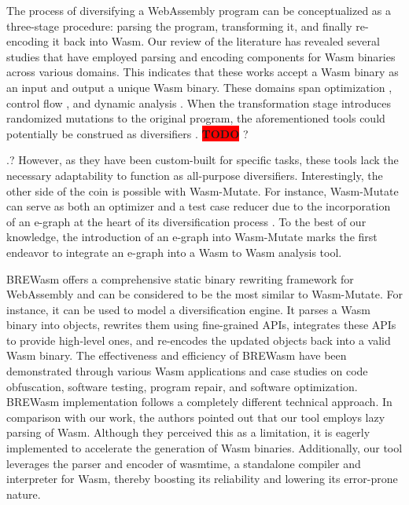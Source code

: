 \documentclass[sigplan,screen]{acmart}
\newcommand*\badge[1]{ \colorbox{red}{\color{white}#1}}
\newcommand{\tool}{{\sc Wasm-Mutate}\xspace}
\newcommand{\wasm}{Wasm\xspace}
\newcommand{\Wasm}{WebAssembly\xspace}
\newcommand{\todo}[1]{%
\refstepcounter{todo}
\noindent\textbf{\badge{TODO}} {\color{red}#1}
\addcontentsline{td}{todo}
{\color{red}\thesection.\thetodo\xspace #1}}
\begin{document}
The process of diversifying a \Wasm program can be conceptualized as a three-stage procedure: parsing the program, transforming it, and finally re-encoding it back into \wasm. 
Our review of the literature has revealed several studies that have employed parsing and encoding components for \wasm binaries across various domains. 
This indicates that these works accept a \wasm binary as an input and output a unique \wasm binary. 
These domains span optimization \cite{wasmslim}, control flow \cite{10123627}, and dynamic analysis \cite{wasabi, stievenart2020compositional, 10123627, BRITO2022102745}.
When the transformation stage introduces randomized mutations to the original program, the aforementioned tools could potentially be construed as diversifiers \cite{some paper claming this}. \todo{?}
However, as they have been custom-built for specific tasks, these tools lack the necessary adaptability to function as all-purpose diversifiers. 
Interestingly, the other side of the coin is possible with \tool.
For instance, \tool can serve as both an optimizer and a test case reducer due to the incorporation of an e-graph at the heart of its diversification process \cite{10.1145/1480881.1480915}. 
To the best of our knowledge, the introduction of an e-graph into \tool marks the first endeavor to integrate an e-graph into a \wasm to \wasm analysis tool.




BREWasm \cite{rewritingtool2023} offers a comprehensive static binary rewriting framework for \Wasm and can be considered to be the most similar to \tool. 
For instance, it can be used to model a diversification engine.
It parses a Wasm binary into objects, rewrites them using fine-grained APIs, integrates these APIs to provide high-level ones, and re-encodes the updated objects back into a valid Wasm binary. 
The effectiveness and efficiency of BREWasm have been demonstrated through various Wasm applications and case studies on code obfuscation, software testing, program repair, and software optimization. 
BREWasm implementation follows a completely different technical approach.
In comparison with our work, the authors pointed out that our tool employs lazy parsing of Wasm. 
Although they perceived this as a limitation, it is eagerly implemented to accelerate the generation of \wasm binaries.
Additionally, our tool leverages the parser and encoder of wasmtime, a standalone compiler and interpreter for Wasm, thereby boosting its reliability and lowering its error-prone nature.
\end{document}
